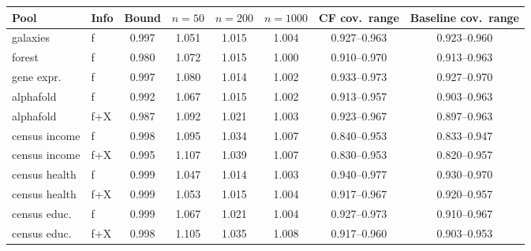 \begin{tabular}{llcccccc}
\toprule
Pool & Info & Bound & $n{=}50$ & $n{=}200$ & $n{=}1000$ & CF cov.\ range & Baseline cov.\ range \\
\midrule
galaxies & f & 0.997 & 1.051 & 1.015 & 1.004 & 0.927--0.963 & 0.923--0.960 \\
forest & f & 0.980 & 1.072 & 1.015 & 1.000 & 0.910--0.970 & 0.913--0.963 \\
gene expr. & f & 0.997 & 1.080 & 1.014 & 1.002 & 0.933--0.973 & 0.927--0.970 \\
alphafold & f & 0.992 & 1.067 & 1.015 & 1.002 & 0.913--0.957 & 0.903--0.963 \\
alphafold & f+X & 0.987 & 1.092 & 1.021 & 1.003 & 0.923--0.967 & 0.897--0.963 \\
census income & f & 0.998 & 1.095 & 1.034 & 1.007 & 0.840--0.953 & 0.833--0.947 \\
census income & f+X & 0.995 & 1.107 & 1.039 & 1.007 & 0.830--0.953 & 0.820--0.957 \\
census health & f & 0.999 & 1.047 & 1.014 & 1.003 & 0.940--0.977 & 0.930--0.970 \\
census health & f+X & 0.999 & 1.053 & 1.015 & 1.004 & 0.917--0.967 & 0.920--0.957 \\
census educ. & f & 0.999 & 1.067 & 1.021 & 1.004 & 0.927--0.973 & 0.910--0.967 \\
census educ. & f+X & 0.998 & 1.105 & 1.035 & 1.008 & 0.917--0.960 & 0.903--0.953 \\
\bottomrule
\end{tabular}
